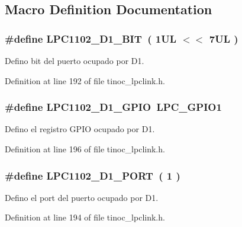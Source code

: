 \subsection{Macro Definition Documentation}
\subsubsection[{\texorpdfstring{L\+P\+C1102\+\_\+\+D1\+\_\+\+B\+IT}{LPC1102_D1_BIT}}]{\setlength{\rightskip}{0pt plus 5cm}\#define L\+P\+C1102\+\_\+\+D1\+\_\+\+B\+IT~( 1\+U\+L $<$$<$ 7\+U\+L )}\hypertarget{group___p_i_n_d1_ga6ae9457c4b1f79250abe5f2960e3a8ee}{}\label{group___p_i_n_d1_ga6ae9457c4b1f79250abe5f2960e3a8ee}


Defino bit del puerto ocupado por D1. 



Definition at line 192 of file tinoc\+\_\+lpclink.\+h.

\subsubsection[{\texorpdfstring{L\+P\+C1102\+\_\+\+D1\+\_\+\+G\+P\+IO}{LPC1102_D1_GPIO}}]{\setlength{\rightskip}{0pt plus 5cm}\#define L\+P\+C1102\+\_\+\+D1\+\_\+\+G\+P\+IO~L\+P\+C\+\_\+\+G\+P\+I\+O1}\hypertarget{group___p_i_n_d1_ga74109f9dcb7ca9657b785faae9d1d142}{}\label{group___p_i_n_d1_ga74109f9dcb7ca9657b785faae9d1d142}


Defino el registro G\+P\+IO ocupado por D1. 



Definition at line 196 of file tinoc\+\_\+lpclink.\+h.

\subsubsection[{\texorpdfstring{L\+P\+C1102\+\_\+\+D1\+\_\+\+P\+O\+RT}{LPC1102_D1_PORT}}]{\setlength{\rightskip}{0pt plus 5cm}\#define L\+P\+C1102\+\_\+\+D1\+\_\+\+P\+O\+RT~( 1 )}\hypertarget{group___p_i_n_d1_gafc2bbd3830383d98ab56a04c3cd3df20}{}\label{group___p_i_n_d1_gafc2bbd3830383d98ab56a04c3cd3df20}


Defino el port del puerto ocupado por D1. 



Definition at line 194 of file tinoc\+\_\+lpclink.\+h.

